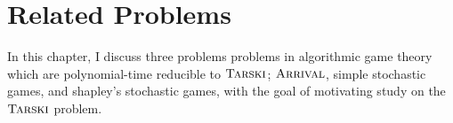\chapter{Related Problems} \label{relatedProblemsChapter}
In this chapter, I discuss three problems problems in algorithmic game theory
which are polynomial-time reducible to $\textsc{Tarski}$; $\textsc{Arrival}$, simple stochastic games, and
shapley's stochastic games, with the goal of motivating study on the $\textsc{Tarski}$ problem.




